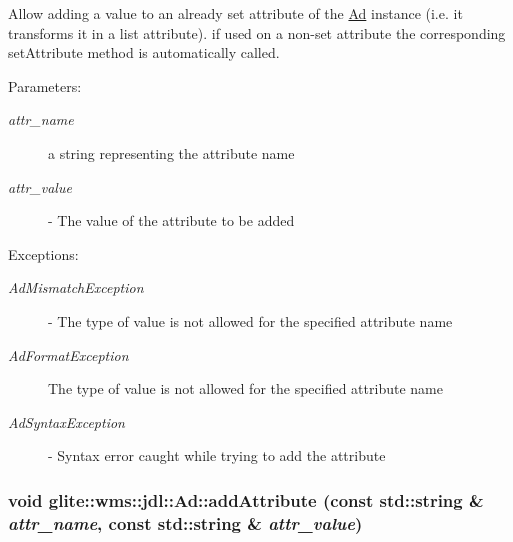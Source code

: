Allow adding a value to an already set attribute of the \hyperlink{classglite_1_1wms_1_1jdl_1_1Ad}{Ad} instance (i.e. it transforms it in a list attribute). if used on a non-set attribute the corresponding set\-Attribute method is automatically called. \begin{Desc}
\item[Parameters:]
\begin{description}
\item[{\em attr\_\-name}]a string representing the attribute name \item[{\em attr\_\-value}]- The value of the attribute to be added \end{description}
\end{Desc}
\begin{Desc}
\item[Exceptions:]
\begin{description}
\item[{\em Ad\-Mismatch\-Exception}]- The type of value is not allowed for the specified attribute name \item[{\em Ad\-Format\-Exception}]The type of value is not allowed for the specified attribute name \item[{\em Ad\-Syntax\-Exception}]- Syntax error caught while trying to add the attribute \end{description}
\end{Desc}
\hypertarget{classglite_1_1wms_1_1jdl_1_1Ad_z19_5}{
\subsubsection[addAttribute]{\setlength{\rightskip}{0pt plus 5cm}void glite::wms::jdl::Ad::add\-Attribute (const std::string \& {\em attr\_\-name}, const std::string \& {\em attr\_\-value})}}
\label{classglite_1_1wms_1_1jdl_1_1Ad_z19_5}


